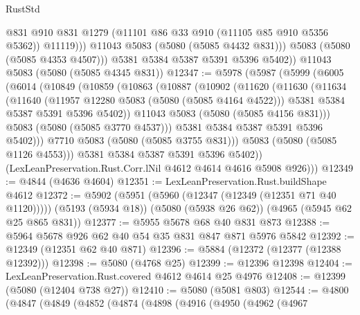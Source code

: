 \begin{lexlean}{RustStd}
\begin{coremodule}
{\begin{coremodule}
{{{{{                  @831
                  @910
                  @831
                  @1279
                  (@11101 @86 @33 @910 (@11105 @85 @910 @5356 @5362))
                  @11119)))
            @11043
            @5083
            (@5080 (@5085 @4432 @831)))
          @5083
          (@5080 (@5085 @4353 @4507)))
        @5381
        @5384
        @5387
        @5391
        @5396
        @5402))
    @11043
    @5083
    (@5080 (@5085 @4345 @831))
@12347 := @5978
    (@5987
      (@5999
        (@6005
          (@6014
            (@10849
              (@10859
                (@10863
                  (@10887
                    (@10902
                      (@11620
                        (@11630
                          (@11634
                            (@11640
                              (@11957 @12280 @5083 (@5080 (@5085 @4164 @4522)))
                              @5381
                              @5384
                              @5387
                              @5391
                              @5396
                              @5402))
                          @11043
                          @5083
                          (@5080 (@5085 @4156 @831)))
                        @5083
                        (@5080 (@5085 @3770 @4537)))
                      @5381
                      @5384
                      @5387
                      @5391
                      @5396
                      @5402)))
                @7710
                @5083
                (@5080 (@5085 @3755 @831)))
              @5083
              (@5080 (@5085 @1126 @4553)))
            @5381
            @5384
            @5387
            @5391
            @5396
            @5402))
        (LexLeanPreservation.Rust.Corr.lNil @4612 @4614 @4616 @5908 @926)))
@12349 := @4844 (@4636 @4604)
@12351 := LexLeanPreservation.Rust.buildShape @4612
@12372 := @5902
    (@5951 (@5960 (@12347 (@12349 (@12351 @71 @40 @1120)))))
    (@5193 (@5934 @18))
    (@5080 (@5938 @26 @62))
    (@4965 (@5945 @62 @25 @865 @831))
@12377 := @5955 @5678 @68 @40 @831 @873
@12388 := @5964 @5678 @926 @62 @40 @54 @35 @831 @847 @871 @5976 @5842
@12392 := @12349 (@12351 @62 @40 @871)
@12396 := @5884 (@12372 (@12377 (@12388 @12392)))
@12398 := @5080 (@4768 @25)
@12399 := @12396 @12398
@12404 := LexLeanPreservation.Rust.covered @4612 @4614 @25 @4976
@12408 := @12399 (@5080 (@12404 @738 @27))
@12410 := @5080 (@5081 @803)
@12544 := @4800
    (@4847
      (@4849
        (@4852
          (@4874
            (@4898
              (@4916
                (@4950
                  (@4962
                    (@4967
}}}}}
\end{coremodule}}
\end{coremodule}
\end{lexlean}
